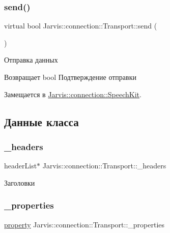 \subsubsection{\texorpdfstring{send()}{send()}}
{\footnotesize\ttfamily virtual bool Jarvis\+::connection\+::\+Transport\+::send (\begin{DoxyParamCaption}{ }\end{DoxyParamCaption})\hspace{0.3cm}{\ttfamily [pure virtual]}}



Отправка данных 

\begin{DoxyReturn}{Возвращает}
bool Подтверждение отправки 
\end{DoxyReturn}


Замещается в \hyperlink{classJarvis_1_1connection_1_1SpeechKit_af213e0c8c3f6bb8a1776f6f21c859713}{Jarvis\+::connection\+::\+Speech\+Kit}.



\subsection{Данные класса}
\mbox{\label{classJarvis_1_1connection_1_1Transport_aa28ff148972b44b6dc6a1523d674e9d3}} 
\subsubsection{\texorpdfstring{\+\_\+headers}{\_headers}}
{\footnotesize\ttfamily header\+List$\ast$ Jarvis\+::connection\+::\+Transport\+::\+\_\+headers}

Заголовки \mbox{\label{classJarvis_1_1connection_1_1Transport_aff80004ef5bbfa118bc9388c04124df2}} 
\subsubsection{\texorpdfstring{\+\_\+properties}{\_properties}}
{\footnotesize\ttfamily \hyperlink{classJarvis_1_1connection_1_1Transport_a81b1e5dc6c0a246fa2a225a1ff185b95}{property} Jarvis\+::connection\+::\+Transport\+::\+\_\+properties}


